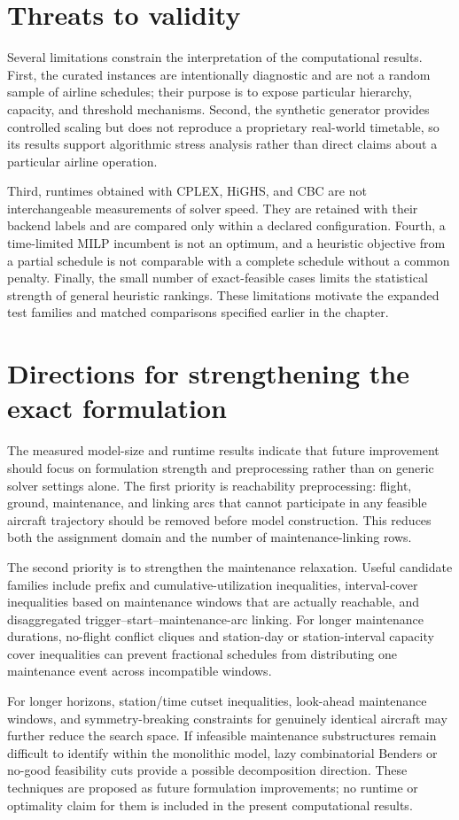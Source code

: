 \section{Threats to validity}
\label{sec:computational_validity}

Several limitations constrain the interpretation of the computational results.
First, the curated instances are intentionally diagnostic and are not a random
sample of airline schedules; their purpose is to expose particular hierarchy,
capacity, and threshold mechanisms. Second, the synthetic generator provides
controlled scaling but does not reproduce a proprietary real-world timetable,
so its results support algorithmic stress analysis rather than direct claims
about a particular airline operation.

Third, runtimes obtained with CPLEX, HiGHS, and CBC are not interchangeable
measurements of solver speed. They are retained with their backend labels and
are compared only within a declared configuration. Fourth, a time-limited MILP
incumbent is not an optimum, and a heuristic objective from a partial schedule
is not comparable with a complete schedule without a common penalty. Finally,
the small number of exact-feasible cases limits the statistical strength of
general heuristic rankings. These limitations motivate the expanded test
families and matched comparisons specified earlier in the chapter.

\section{Directions for strengthening the exact formulation}
\label{sec:computational_strengthening}

The measured model-size and runtime results indicate that future improvement
should focus on formulation strength and preprocessing rather than on generic
solver settings alone. The first priority is reachability preprocessing:
flight, ground, maintenance, and linking arcs that cannot participate in any
feasible aircraft trajectory should be removed before model construction. This
reduces both the assignment domain and the number of maintenance-linking rows.

The second priority is to strengthen the maintenance relaxation. Useful
candidate families include prefix and cumulative-utilization inequalities,
interval-cover inequalities based on maintenance windows that are actually
reachable, and disaggregated trigger--start--maintenance-arc linking. For
longer maintenance durations, no-flight conflict cliques and station-day or
station-interval capacity cover inequalities can prevent fractional schedules
from distributing one maintenance event across incompatible windows.

For longer horizons, station/time cutset inequalities, look-ahead maintenance
windows, and symmetry-breaking constraints for genuinely identical aircraft
may further reduce the search space. If infeasible maintenance substructures
remain difficult to identify within the monolithic model, lazy combinatorial
Benders or no-good feasibility cuts provide a possible decomposition direction.
These techniques are proposed as future formulation improvements; no runtime
or optimality claim for them is included in the present computational results.
